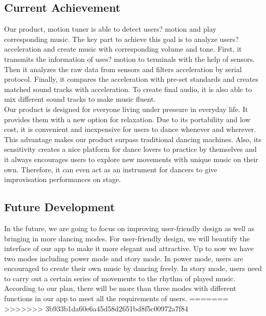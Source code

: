 \documentclass{article}
\begin{document}
\subsection{Current Achievement}
\hspace*{2em}Our product, motion tuner is able to detect users? motion and play corresponding music. The key part to achieve this goal is to analyze users? acceleration and create music with corresponding volume and tone. First, it transmits the information of uses? motion to terminals with the help of sensors. Then it analyzes the raw data from sensors and filters acceleration by serial protocol. Finally, it compares the acceleration with pre-set standards and creates matched sound tracks with acceleration. To create final audio, it is also able to mix different sound tracks to make music fluent. \\
\hspace*{2em}Our product is designed for everyone living under pressure in everyday life. It provides them with a new option for relaxation. Due to its portability and low cost, it is convenient and inexpensive for users to dance whenever and wherever. This advantage makes our product surpass traditional dancing machines. Also, its sensitivity creates a nice platform for dance lovers to practice by themselves and it always encourages users to explore new movements with unique music on their own. Therefore, it can even act as an instrument for dancers to give improvisation performances on stage.
\subsection{Future Development}
\hspace*{2em}In the future, we are going to focus on improving user-friendly design as well as bringing in more dancing modes. For user-friendly design, we will beautify the interface of our app to make it more elegant and attractive. Up to now we have two modes including power mode and story mode. In power mode, users are encouraged to create their own music by dancing freely. In story mode, users need to carry out a certain series of movements to the rhythm of played music. According to our plan, there will be more than three modes with different functions in our app to meet all the requirements of users.
=======
>>>>>>> 3b933b1da60e6a45d58d2651bd8f5c00972a7f84

\newpage

\end{document}
